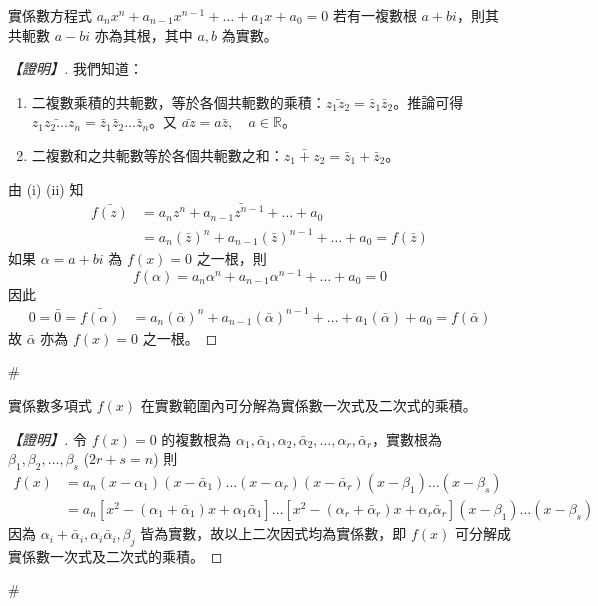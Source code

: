 \begin{theorem}[虛根共軛定理]\label{thm:b6-2-conjugate}
實係數方程式 $a_n x^n + a_{n-1} x^{n-1} + \dots + a_1 x + a_0 = 0$ 若有一複數根 $a+bi$，則其共軛數 $a-bi$ 亦為其根，其中 $a, b$ 為實數。
\end{theorem}

\begin{proof}[【證明】]
我們知道：
\begin{enumerate}[label=(\roman*), leftmargin=2em]
  \item 二複數乘積的共軛數，等於各個共軛數的乘積：$\bar{z_1 z_2} = \bar{z}_1 \bar{z}_2$。推論可得 $\bar{z_1 z_2 \dots z_n} = \bar{z}_1 \bar{z}_2 \dots \bar{z}_n$。又 $\bar{az} = a\bar{z}, \quad a \in \mathbb{R}$。
  \item 二複數和之共軛數等於各個共軛數之和：$\bar{z_1 + z_2} = \bar{z}_1 + \bar{z}_2$。
\end{enumerate}
由 (i) (ii) 知
\begin{align*}
\bar{f(z)} &= \bar{a_n z^n + a_{n-1} z^{n-1} + \dots + a_0} \\
&= a_n (\bar{z})^n + a_{n-1} (\bar{z})^{n-1} + \dots + a_0 = f(\bar{z})
\end{align*}
如果 $\alpha = a+bi$ 為 $f(x)=0$ 之一根，則
\[ f(\alpha) = a_n \alpha^n + a_{n-1} \alpha^{n-1} + \dots + a_0 = 0 \]
因此
\begin{align*}
0 = \bar{0} = \bar{f(\alpha)} &= a_n (\bar{\alpha})^n + a_{n-1} (\bar{\alpha})^{n-1} + \dots + a_1 (\bar{\alpha}) + a_0 = f(\bar{\alpha})
\end{align*}
故 $\bar{\alpha}$ 亦為 $f(x)=0$ 之一根。
\end{proof}\hfill$\#$

\begin{corollary}\label{cor:b6-2-real-factor}
實係數多項式 $f(x)$ 在實數範圍內可分解為實係數一次式及二次式的乘積。
\end{corollary}

\begin{proof}[【證明】]
令 $f(x)=0$ 的複數根為 $\alpha_1, \bar{\alpha}_1, \alpha_2, \bar{\alpha}_2, \dots, \alpha_r, \bar{\alpha}_r$，實數根為 $\beta_1, \beta_2, \dots, \beta_s$ ($2r+s=n$) 則
\begin{align*}
f(x) &= a_n (x-\alpha_1)(x-\bar{\alpha}_1)\dots(x-\alpha_r)(x-\bar{\alpha}_r)(x-\beta_1)\dots(x-\beta_s) \\
&= a_n [x^2 - (\alpha_1+\bar{\alpha}_1)x + \alpha_1\bar{\alpha}_1]\dots[x^2 - (\alpha_r+\bar{\alpha}_r)x + \alpha_r\bar{\alpha}_r](x-\beta_1)\dots(x-\beta_s)
\end{align*}
因為 $\alpha_i+\bar{\alpha}_i, \alpha_i\bar{\alpha}_i, \beta_j$ 皆為實數，故以上二次因式均為實係數，即 $f(x)$ 可分解成實係數一次式及二次式的乘積。
\end{proof}\hfill$\#$

